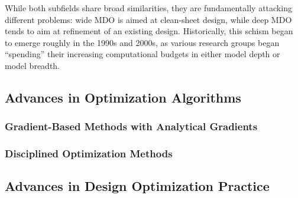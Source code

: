 \documentclass[12pt,vi,oneside]{report}
\begin{document}
    While both subfields share broad similarities, they are fundamentally attacking different problems: wide MDO is aimed at clean-sheet design, while deep MDO tends to aim at refinement of an existing design. Historically, this schism began to emerge roughly in the 1990s and 2000s, as various research groups began ``spending'' their increasing computational budgets in either model depth or model breadth.

    \subsection{Advances in Optimization Algorithms}

    \subsubsection{Gradient-Based Methods with Analytical Gradients}


    \subsubsection{Disciplined Optimization Methods}

    \subsection{Advances in Design Optimization Practice}


\end{document}
